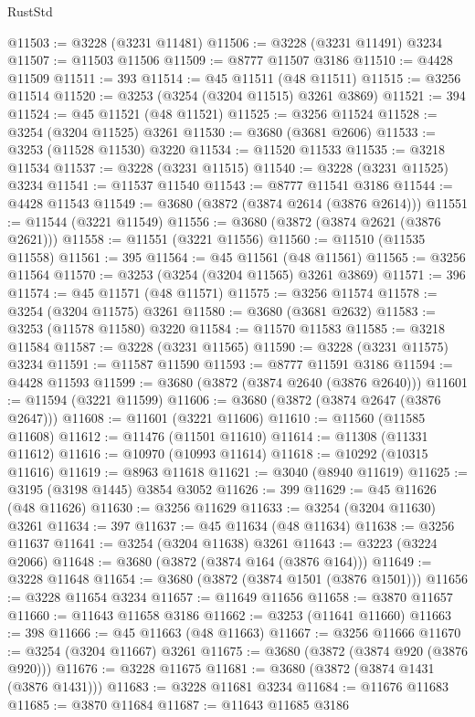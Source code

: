 \begin{lexlean}{RustStd}
\begin{coremodule}
@11503 := @3228 (@3231 @11481)
@11506 := @3228 (@3231 @11491) @3234
@11507 := @11503 @11506
@11509 := @8777 @11507 @3186
@11510 := @4428 @11509
@11511 := 393
@11514 := @45 @11511 (@48 @11511)
@11515 := @3256 @11514
@11520 := @3253 (@3254 (@3204 @11515) @3261 @3869)
@11521 := 394
@11524 := @45 @11521 (@48 @11521)
@11525 := @3256 @11524
@11528 := @3254 (@3204 @11525) @3261
@11530 := @3680 (@3681 @2606)
@11533 := @3253 (@11528 @11530) @3220
@11534 := @11520 @11533
@11535 := @3218 @11534
@11537 := @3228 (@3231 @11515)
@11540 := @3228 (@3231 @11525) @3234
@11541 := @11537 @11540
@11543 := @8777 @11541 @3186
@11544 := @4428 @11543
@11549 := @3680 (@3872 (@3874 @2614 (@3876 @2614)))
@11551 := @11544 (@3221 @11549)
@11556 := @3680 (@3872 (@3874 @2621 (@3876 @2621)))
@11558 := @11551 (@3221 @11556)
@11560 := @11510 (@11535 @11558)
@11561 := 395
@11564 := @45 @11561 (@48 @11561)
@11565 := @3256 @11564
@11570 := @3253 (@3254 (@3204 @11565) @3261 @3869)
@11571 := 396
@11574 := @45 @11571 (@48 @11571)
@11575 := @3256 @11574
@11578 := @3254 (@3204 @11575) @3261
@11580 := @3680 (@3681 @2632)
@11583 := @3253 (@11578 @11580) @3220
@11584 := @11570 @11583
@11585 := @3218 @11584
@11587 := @3228 (@3231 @11565)
@11590 := @3228 (@3231 @11575) @3234
@11591 := @11587 @11590
@11593 := @8777 @11591 @3186
@11594 := @4428 @11593
@11599 := @3680 (@3872 (@3874 @2640 (@3876 @2640)))
@11601 := @11594 (@3221 @11599)
@11606 := @3680 (@3872 (@3874 @2647 (@3876 @2647)))
@11608 := @11601 (@3221 @11606)
@11610 := @11560 (@11585 @11608)
@11612 := @11476 (@11501 @11610)
@11614 := @11308 (@11331 @11612)
@11616 := @10970 (@10993 @11614)
@11618 := @10292 (@10315 @11616)
@11619 := @8963 @11618
@11621 := @3040 (@8940 @11619)
@11625 := @3195 (@3198 @1445) @3854 @3052
@11626 := 399
@11629 := @45 @11626 (@48 @11626)
@11630 := @3256 @11629
@11633 := @3254 (@3204 @11630) @3261
@11634 := 397
@11637 := @45 @11634 (@48 @11634)
@11638 := @3256 @11637
@11641 := @3254 (@3204 @11638) @3261
@11643 := @3223 (@3224 @2066)
@11648 := @3680 (@3872 (@3874 @164 (@3876 @164)))
@11649 := @3228 @11648
@11654 := @3680 (@3872 (@3874 @1501 (@3876 @1501)))
@11656 := @3228 @11654 @3234
@11657 := @11649 @11656
@11658 := @3870 @11657
@11660 := @11643 @11658 @3186
@11662 := @3253 (@11641 @11660)
@11663 := 398
@11666 := @45 @11663 (@48 @11663)
@11667 := @3256 @11666
@11670 := @3254 (@3204 @11667) @3261
@11675 := @3680 (@3872 (@3874 @920 (@3876 @920)))
@11676 := @3228 @11675
@11681 := @3680 (@3872 (@3874 @1431 (@3876 @1431)))
@11683 := @3228 @11681 @3234
@11684 := @11676 @11683
@11685 := @3870 @11684
@11687 := @11643 @11685 @3186

\end{coremodule}
\end{lexlean}
